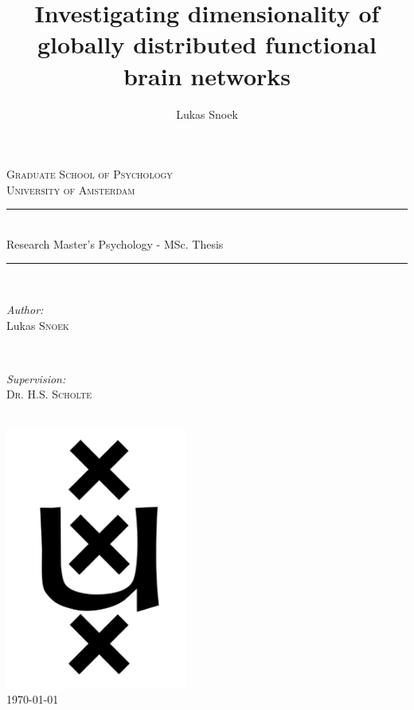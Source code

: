\documentclass[jou,12pt,a4paper]{apa6}
\title{\LARGE Investigating dimensionality of globally distributed functional brain networks}
\author{Lukas Snoek}
\affiliation{University of Amsterdam}
\begin{document}

\begin{titlepage}

\newcommand{\HRule}{\rule{\linewidth}{0.5mm}} 
\center 

\textsc{\LARGE Graduate School of Psychology}\\[1cm] 
\textsc{\Large University of Amsterdam}\\[1cm]

\HRule \\[0.4cm]
{ \huge Research Master's Psychology - MSc. Thesis}\\[0.4cm] 
\HRule \\[1.5cm]
 
\begin{minipage}{0.4\textwidth}
\begin{flushleft} \large
\emph{Author:}\\
Lukas \textsc{Snoek} 
\end{flushleft}
\end{minipage}
~
\begin{minipage}{0.4\textwidth}
\begin{flushright} \large
\emph{Supervision:} \\
\textsc{Dr. H.S. Scholte} 
\end{flushright}
\end{minipage}\\[1cm]

\includegraphics[width=60mm]{uva_logo_inv}\\[1cm] 

{\large \today}\\[2cm]

\vfill 

\end{titlepage}
\end{document}
